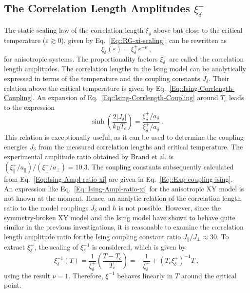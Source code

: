 	\subsection{The Correlation Length Amplitudes ${\xi_\delta^+}$}
	The static scaling law of the correlation length $\xi_\delta$ above but close to the critical temperature ($\varepsilon \gtrsim 0$), given by Eq.~\eqref{Eq::RG-xi-scaling}, can be rewritten as
	\begin{equation} \label{Eq::Xi-divergence-amplitude}
		\xi_\delta (\varepsilon) = \xi_\delta^{+} \varepsilon^{-\nu}~,
	\end{equation}
	for anisotropic systems. The proportionality factors $\xi_\delta^{+}$ are called the correlation length amplitudes. The correlation lengths in the Ising model can be analytically expressed in terms of the temperature and the coupling constants $J_\delta$. Their relation above the critical temperature is given by Eq.~\eqref{Eq::Ising-Corrlength-Coupling}. An expansion of Eq.~\eqref{Eq::Ising-Corrlength-Coupling} around $T_c$ leads to the expression
	\begin{equation} \label{Eq::Ising-Ampl-ratio-xi}
		\sinh \left(\frac{2 |J_\delta|}{k_B T_c}\right) =	\frac{\xi_\delta^+ / a_\delta}{\xi_{\overline{\delta}}^+ / a_{\overline{\delta}}}~.
	\end{equation}
	This relation is exceptionally useful, as it can be used to determine the coupling energies $J_\delta$ from the measured correlation lengths and critical temperature. The experimental amplitude ratio obtained by Brand et al. \cite{brand2023dimer, brand2023critical}  is $({\xi_\parallel^+ / a_\parallel}) \big/	({\xi_{\perp}^+ / a_{\perp}}) =	10.3$.  The coupling constants subsequently calculated from Eq.~\eqref{Eq::Ising-Ampl-ratio-xi} are given in Eq.~\eqref{Eq::Exp-coupling-ising}.\\
	
	An expression like Eq.~\eqref{Eq::Ising-Ampl-ratio-xi} for the anisotropic XY model is not known at the moment. Hence, an analytic relation of the correlation length ratio to the model couplings $J_\delta$ and $h$ is not possible. However, since the symmetry-broken XY model and the Ising model have shown to behave quite similar in the previous investigations, it is reasonable to examine the correlation length amplitude ratio for the Ising coupling constant ratio $J_\parallel /	J_\perp \approx	30$. To extract $\xi^+_\delta$, the scaling of $\xi_\delta^{-1}$ is considered, which is given by
	\begin{equation} \label{Eq::inv-divergence-fit}
		\xi_\delta^{-1}(T) =	\frac{1}{\xi_\delta^+} \left(\frac{T - T_c}{T_c}\right) =	- \frac{1}{\xi_\delta^+} + (T_c \xi_\delta^+)^{-1} T ~,
	\end{equation}
	using the result $\nu =	1$. Therefore, $\xi^{-1}$ behaves linearly in $T$ around the critical point.\\
	
